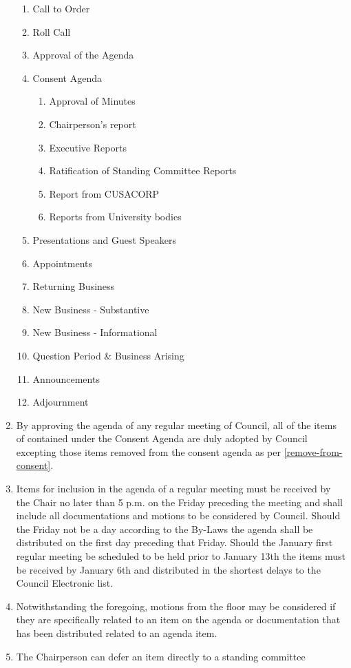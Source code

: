 \documentclass[oneside]{book}
\begin{document}
\begin{enumerate}
\begin{enumerate}
\item Call to Order 
\item Roll Call
\item Approval of the Agenda
\item Consent Agenda 
\begin{enumerate}
\item Approval of Minutes 
\item Chairperson's report
\item Executive Reports 
\item Ratification of Standing Committee Reports
\item Report from CUSACORP 
\item Reports from University bodies
\end{enumerate}
\item Presentations and Guest Speakers 
\item Appointments
\item Returning Business
\item New Business - Substantive
\item New Business - Informational
\item Question Period \& Business Arising
\item Announcements 
\item Adjournment 
\end{enumerate}
\item By approving the agenda of any regular meeting of Council, all of the 
items of contained under the Consent Agenda are duly adopted by Council excepting 
those items removed from the consent agenda as per \autoref{remove-from-consent}.
\item Items for inclusion in the agenda of a regular meeting must be received
by the Chair no later than 5 p.m. on the Friday preceding the meeting and shall include
all documentations and motions to be considered by Council. Should the Friday not be a day 
according to the By-Laws the agenda shall be distributed on the first day preceding that Friday. 
Should the January first regular meeting be scheduled to be held prior to January 13th
the items must be received by January 6th and distributed in the shortest delays to the 
Council Electronic list. 
\item Notwithstanding the foregoing, motions from the floor may be considered if they are
specifically related to an item on the agenda or documentation that
has been distributed related to an agenda item.
\item The Chairperson can defer an item directly to a standing committee

\end{enumerate}
\end{document}
